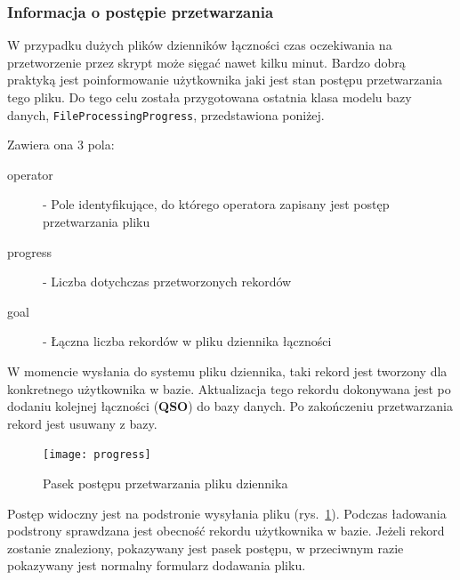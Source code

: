 \documentclass[]{mgr}
\begin{document}
                \subsubsection{Informacja o postępie przetwarzania}
                W przypadku dużych plików dzienników łączności czas oczekiwania na przetworzenie przez skrypt może sięgać nawet kilku minut. Bardzo dobrą praktyką jest poinformowanie użytkownika jaki jest stan postępu przetwarzania tego pliku. Do tego celu została przygotowana ostatnia klasa modelu bazy danych, \texttt{FileProcessingProgress}, przedstawiona poniżej. 
                
                Zawiera ona 3 pola:
                \begin{description}
                    \item[operator] - Pole identyfikujące, do którego operatora zapisany jest postęp przetwarzania pliku
                    \item[progress] - Liczba dotychczas przetworzonych rekordów
                    \item[goal] - Łączna liczba rekordów w pliku dziennika łączności
                \end{description}
                W momencie wysłania do systemu pliku dziennika, taki rekord jest tworzony dla konkretnego użytkownika w bazie. Aktualizacja tego rekordu dokonywana jest po dodaniu kolejnej łączności (\textbf{QSO}) do bazy danych. Po zakończeniu przetwarzania rekord jest usuwany z bazy.

                \begin{figure}[hb!]
                    \centering
                    \texttt{[image: progress]}
                    \caption{Pasek postępu przetwarzania pliku dziennika}
                    \label{fig:progress}
                \end{figure}

                Postęp widoczny jest na podstronie wysyłania pliku (rys.~\ref{fig:progress}). Podczas ładowania podstrony sprawdzana jest obecność rekordu użytkownika w bazie. Jeżeli rekord zostanie znaleziony, pokazywany jest pasek postępu, w przeciwnym razie pokazywany jest normalny formularz dodawania pliku.
\end{document}
